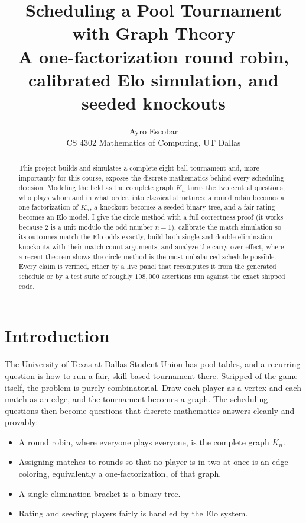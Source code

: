 \documentclass[11pt]{article}
\title{\vspace{-1.2cm}\textbf{Scheduling a Pool Tournament with Graph Theory}\\
\large A one-factorization round robin, calibrated Elo simulation, and seeded knockouts}
\author{Ayro Escobar \\ CS 4302 Mathematics of Computing, UT Dallas}
\date{}
\begin{document}
\maketitle
\vspace{-1.0cm}

\begin{abstract}
\noindent This project builds and simulates a complete eight ball tournament and,
more importantly for this course, exposes the discrete mathematics behind every
scheduling decision. Modeling the field as the complete graph $K_n$ turns the two
central questions, who plays whom and in what order, into classical structures: a
round robin becomes a one-factorization of $K_n$, a knockout becomes a seeded
binary tree, and a fair rating becomes an Elo model. I give the circle method with
a full correctness proof (it works because $2$ is a unit modulo the odd number
$n-1$), calibrate the match simulation so its outcomes match the Elo odds exactly,
build both single and double elimination knockouts with their match count
arguments, and analyze the carry-over effect, where a recent theorem shows the
circle method is the most unbalanced schedule possible. Every claim is verified,
either by a live panel that recomputes it from the generated schedule or by a test
suite of roughly $108{,}000$ assertions run against the exact shipped code.
\end{abstract}

\section{Introduction}

The University of Texas at Dallas Student Union has pool tables, and a recurring
question is how to run a fair, skill based tournament there. Stripped of the game
itself, the problem is purely combinatorial. Draw each player as a vertex and each
match as an edge, and the tournament becomes a graph. The scheduling questions then
become questions that discrete mathematics answers cleanly and provably:

\begin{itemize}[nosep,leftmargin=1.4em]
  \item A round robin, where everyone plays everyone, is the complete graph $K_n$.
  \item Assigning matches to rounds so that no player is in two at once is an edge
        coloring, equivalently a one-factorization, of that graph.
  \item A single elimination bracket is a binary tree.
  \item Rating and seeding players fairly is handled by the Elo system.
\end{itemize}
\end{document}
